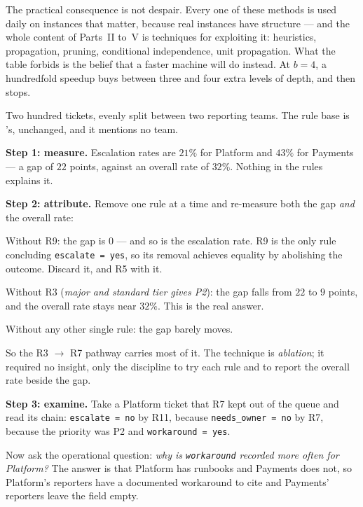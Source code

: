 The practical consequence is not despair. Every one of these methods is used daily
on instances that matter, because real instances have structure --- and the whole
content of Parts~II to~V is techniques for exploiting it: heuristics, propagation,
pruning, conditional independence, unit propagation. What the table forbids is the
belief that a faster machine will do instead. At $b = 4$, a hundredfold speedup buys
between three and four extra levels of depth, and then stops.

\begin{worked}
Two hundred tickets, evenly split between two reporting teams. The rule base is
's, unchanged, and it mentions no team.

\smallskip
\textbf{Step 1: measure.} Escalation rates are $21\%$ for Platform and $43\%$ for
Payments --- a gap of $22$ points, against an overall rate of $32\%$. Nothing in
the rules explains it.

\smallskip
\textbf{Step 2: attribute.} Remove one rule at a time and re-measure both the gap
\emph{and} the overall rate:
\begin{tight}
  \item Without R9: the gap is $0$ --- and so is the escalation rate. R9 is the only
        rule concluding \texttt{escalate = yes}, so its removal achieves equality by
        abolishing the outcome. Discard it, and R5 with it.
  \item Without R3 (\emph{major and standard tier gives P2}): the gap falls from
        $22$ to $9$ points, and the overall rate stays near $32\%$. This is the
        real answer.
  \item Without any other single rule: the gap barely moves.
\end{tight}
So the R3 $\to$ R7 pathway carries most of it. The technique is \emph{ablation}; it
required no insight, only the discipline to try each rule and to report the overall
rate beside the gap.

\smallskip
\textbf{Step 3: examine.} Take a Platform ticket that R7 kept out of the queue and
read its chain: \texttt{escalate = no} by R11, because \texttt{needs\_owner = no} by
R7, because the priority was P2 and \texttt{workaround = yes}.

Now ask the operational question: \emph{why is \texttt{workaround} recorded more
often for Platform?} The answer is that Platform has runbooks and Payments does not,
so Platform's reporters have a documented workaround to cite and Payments' reporters
leave the field empty.


\end{worked}
